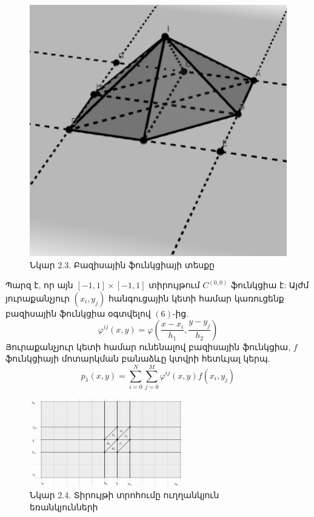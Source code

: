 \documentclass[fleqn, bachelor,subf,12pt,notitlepage]{article}
\begin{document}
\begin{figure}[h!]
\begin{minipage}[b]{0.4\textwidth}
    \includegraphics[width=\textwidth]{images/two_var_courant_2}
    \captionsetup{labelformat=empty}
    \caption{Նկար 2.3. Բազիսային ֆունկցիայի տեսքը}
  \end{minipage}
\end{figure}

Պարզ է, որ այն $\left[-1, 1\right] \times \left[-1, 1\right]$ տիրույթում $C^{(0, 0)}$ ֆունկցիա է:
Այժմ յուրաքանչյուր $\left(x_{i}, y_{j}\right)$ հանգուցային կետի համար կառուցենք բազիսային ֆունկցիա օգտվելով $\left(6\right)$-ից.
\begin{equation}
\varphi^{ij}(x,y)=\varphi \left(\dfrac{x-x_{i}}{h_{1}}, \dfrac{y-y_{j}}{h_{2}}\right)
\end{equation}
\newpage
Յուրաքանչյուր կետի համար ունենալով բազիսային ֆունկցիա, $f$ ֆունկցիայի մոտարկման բանաձևը կտվրի հետևյալ կերպ.
\begin{equation}
p_{1}(x,y)=\sum_{i=0}^{N}\sum_{j=0}^{M}\varphi^{ij}(x,y)f(x_{i}, y_{j})
\end{equation}
\begin{figure}[h!]
\centering
\includegraphics[width=0.6\textwidth]{images/two_var_courant_3}
\captionsetup{labelformat=empty}
\caption{\hfill Նկար 2.4. Տիրույթի տրոհումը ուղղանկյուն եռանկյունների}
\end{figure}
\end{document}
